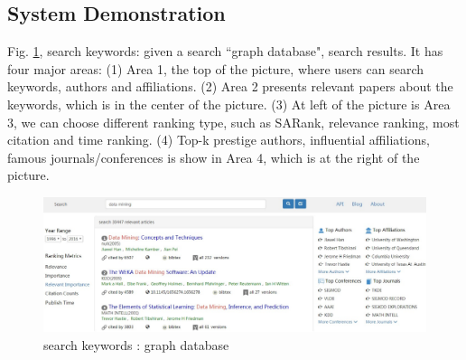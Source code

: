 \subsection{System Demonstration}
Fig. \ref{fig: search keywords}, search keywords: given a search ``graph database", search results. It has four major areas: (1) Area 1, the top of the picture, where users can search keywords, authors and affiliations. (2) Area 2 presents relevant papers about the keywords, which is in the center of the picture. (3) At left of the picture is Area 3, we can choose different ranking type, such as SARank, relevance ranking, most citation and time ranking. (4) Top-k prestige authors, influential affiliations, famous journals/conferences is show in Area 4, which is at the right of the picture.



\begin{figure}[tp]
\centering
\includegraphics[width=\textwidth]{searchKeywords.pdf}
\caption{search keywords : graph database}
\label{fig: search keywords}
\end{figure}


